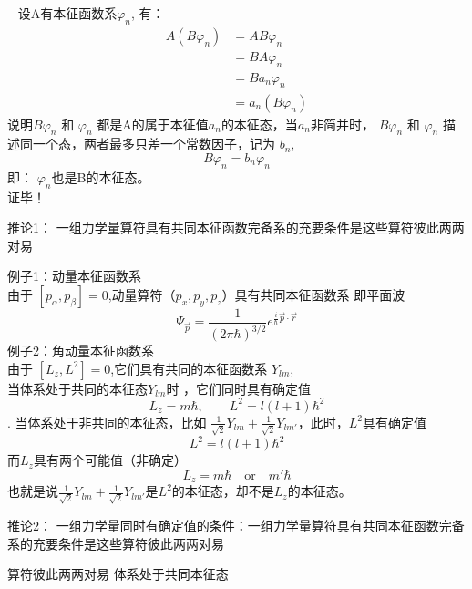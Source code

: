 \begin{frame} [allowframebreaks=]
    \证~ 设A有本征函数系{$\varphi_n$}, 有：
        \begin{equation*}
            \begin{split} 
            A(B\varphi_n)&= AB\varphi_n\\
            &=BA\varphi_n \\
            &=Ba_n\varphi_n \\
            &=a_n(B\varphi_n) 
            \end{split}  
        \end{equation*}  
        说明$B\varphi_n$ 和 $\varphi_n$ 都是A的属于本征值$a_n$的本征态，当$a_n$非简并时， 
        $B\varphi_n$ 和 $\varphi_n$ 描述同一个态，两者最多只差一个常数因子，记为 $b_n$,
        $$ B\varphi_n=b_n \varphi_n$$
        即： $\varphi_n$也是B的本征态。\\
        证毕！
\end{frame} 

\begin{frame} [allowframebreaks=]
    \begin{tcolorbox1}{推论1：}
        一组力学量算符具有共同本征函数完备系的充要条件是这些算符彼此两两对易
    \end{tcolorbox1}
    \alert{例子1：动量本征函数系} \\
    由于 $[p_\alpha,p_\beta]=0$,动量算符（$p_x, p_y, p_z$）具有共同本征函数系 即平面波\\
    $$ \Psi_{\vec p}= \frac{1}{(2\pi\hbar)^{3/2}} e^{\frac{i}{\hbar}\vec{p}\cdot\vec{r}}$$ 
    \alert{例子2：角动量本征函数系} \\
    由于 $[L_z,L^2]=0$,它们具有共同的本征函数系 {$Y_{lm}$},\\
    当体系处于共同的本征态$Y_{lm}$时 ，它们同时具有确定值
    $$L_z= m\hbar, \qquad L^2=l(l+1)\hbar ^2 $$.
    当体系处于非共同的本征态，比如 $\frac{1}{\sqrt{2}}Y_{lm} + \frac{1}{\sqrt{2}}Y_{lm'}$，此时，$L^2$具有确定值
    $$L^2=l(l+1)\hbar ^2 $$
    而$L_z$具有两个可能值（非确定）
    $$L_z= m\hbar\quad \text{or} \quad m'\hbar$$
    也就是说$\frac{1}{\sqrt{2}}Y_{lm} + \frac{1}{\sqrt{2}}Y_{lm'}$是$L^2$的本征态，却不是$L_z$的本征态。
\end{frame} 

\begin{frame}
    \begin{tcolorbox1}{推论2：}
        一组力学量同时有确定值的条件：一组力学量算符具有共同本征函数完备系的充要条件是这些算符彼此两两对易
    \begin{enumerate}
    \Item 算符彼此两两对易
    \Item 体系处于共同本征态
    \end{enumerate}
    \end{tcolorbox1}

\end{frame} 

